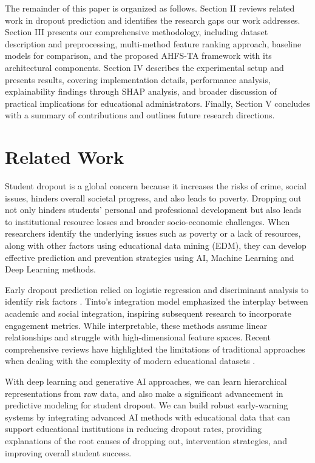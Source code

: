 \documentclass[journal]{IEEEtran}
\begin{document}
The remainder of this paper is organized as follows. Section II reviews related work in dropout prediction and identifies the research gaps our work addresses. Section III presents our comprehensive methodology, including dataset description and preprocessing, multi-method feature ranking approach, baseline models for comparison, and the proposed AHFS-TA framework with its architectural components. Section IV describes the experimental setup and presents results, covering implementation details, performance analysis, explainability findings through SHAP analysis, and broader discussion of practical implications for educational administrators. Finally, Section V concludes with a summary of contributions and outlines future research directions.

\section{Related Work}

Student dropout is a global concern because it increases the risks of crime, social issues, hinders overall societal progress, and also leads to poverty. Dropping out not only hinders students’ personal and professional development but also leads to institutional resource losses and broader socio-economic challenges.
When researchers identify the underlying issues such as poverty or a lack of resources, along with other factors using educational data mining (EDM), they can develop effective prediction and prevention strategies using AI, Machine Learning and Deep Learning methods.

Early dropout prediction relied on logistic regression and discriminant analysis to identify risk factors \cite{huynh2025early,castro2025predictive}. 
Tinto's integration model \cite{nuuyoma2025revisiting} emphasized the interplay between academic and social integration, inspiring subsequent research to incorporate engagement metrics.
While interpretable, these methods assume linear relationships and struggle with high-dimensional feature spaces. Recent comprehensive reviews have highlighted the limitations of traditional approaches when dealing with the complexity of modern educational datasets \cite{alyahyan2023student,das2024machine}.

With deep learning and generative AI approaches, we can learn hierarchical representations from raw data, and also make a significant advancement in predictive modeling for student dropout. We can build robust early-warning systems by integrating advanced AI methods with educational data that can support educational institutions in reducing dropout rates, providing explanations of the root causes of dropping out, intervention strategies, and improving overall student success. 
\end{document}
